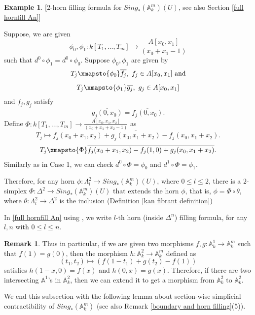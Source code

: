 \documentclass[11pt, reqno]{amsart}
\theoremstyle{plain}
\theoremstyle{definition}
\newtheorem{remark}[thm]{Remark}
\newtheorem{example}[thm]{Example}
\newcommand{\Spec}{{\rm Spec \,}}
\newcommand{\A}{{\mathbb A}}
\begin{document}
\begin{example}{[$2$-horn filling formula for $Sing_*(\A^m_k)(U)$, see also Section \ref{full hornfill An}]}
\begin{enumerate}[start=1,label={\bfseries Case \arabic*:}]
		Suppose, we are given
		$$\phi_0, \phi_1: k[T_1,\dots,T_m] \to \frac{A[x_0, x_1]}{(x_0 + x_1 -1)}$$
		such that $d^0 \circ \phi_1 = d^0 \circ \phi_0$. Suppose $\phi_0, \phi_1$ are given by
		$$T_j \xmapsto{\phi_0} \overline{f_j}, \ f_j \in A[x_0, x_1] \text{ and}$$
		$$T_j \xmapsto{\phi_1} \overline{g_j}, \ g_j \in A[x_0, x_1]$$
		and $f_j, g_j$ satisfy
		$$\overline{g_j(0, x_0)} = \overline{f_j(0, x_0)}.$$
		Define $\Phi: k[T_1,\dots,T_m] \to \frac{A[x_0, x_1, x_2]}{(x_0 + x_1 +x_2-1)}$
		as 
		$$T_j \mapsto \overline{f_j(x_0+ x_1,x_2) + g_j(x_0, x_1+ x_2) - f_j(x_0, x_1+ x_2) }.$$
		$$T_j \xmapsto{\Phi} \overline{f_j(x_0+x_1, x_2) - f_j(1, 0) + g_j(x_0, x_1 + x_2)}.$$
		Similarly as in Case 1, we can check $d^0 \circ \Phi = \phi_0$ and $d^1 \circ \Phi = \phi_1$. 
		
		Therefore, for any horn $\phi: \Lambda^2_l \to Sing_*(\A^m_k)(U)$, where $0 \leq l \leq 2$, there is a $2$-simplex $\Phi:\Delta^2 \to Sing_*(\A^m_k)(U)$ that extends the horn $\phi$, that is, $\phi= \Phi \circ \theta$, where $\theta: \Lambda^2_l \to \Delta^2$ is the inclusion (Definition \ref{kan fibrant definition})
	\end{enumerate}
\end{example}
In \ref{full hornfill An} using \cite[Lemma 3.1]{curtis-simplicial}, we write $l$-th horn (inside $\Delta^n$) filling formula, for any $l,n$ with $0 \leq l \leq n$.









\begin{remark} \cite[Example 2.19]{choudhury2}
Thus in particular, if we are given two morphisms $f, g : \mathbb{A}^1_k \to \mathbb{A}^m_k$ such that $f(1) = g(0)$, then the morphism
$h: \mathbb{A}^2_k \to \mathbb{A}^m_k$ defined as
$$(t_1, t_2) \mapsto (f(1-t_1)+g(t_2) - f(1))$$
satisfies $h(1-x, 0) = f(x)$ and $h(0, x) = g(x)$. 
Therefore, if there are two intersecting $\mathbb{A}^1$'s in $\mathbb{A}^2_k$, then we can extend it to get a morphism from $\mathbb{A}^2_k$ to $\mathbb{A}^2_k$.
\end{remark}
We end this subsection with the following lemma about section-wise simplicial contractibility of $Sing_*(\A^m_k)$ (see also Remark \ref{boundary and horn filling}(5)). 
\end{document}
